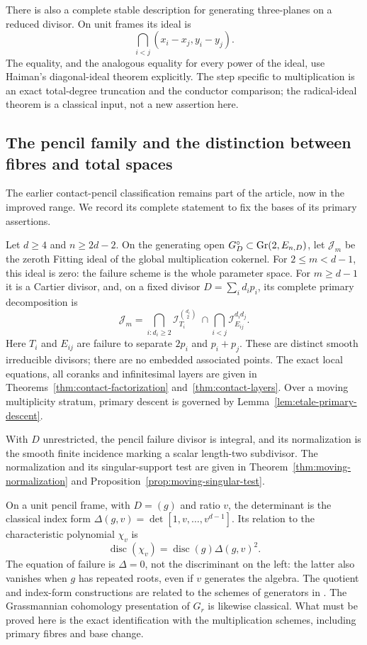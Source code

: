 There is also a complete stable description for generating
three-planes on a reduced divisor. On unit frames its ideal is
\[
 \bigcap_{i<j}(x_i-x_j,y_i-y_j).
\]
The equality, and the analogous equality for every power of the
ideal, use Haiman's diagonal-ideal theorem explicitly. The step
specific to multiplication is an exact total-degree truncation and
the conductor comparison; the radical-ideal theorem is a classical
input, not a new assertion here.

\subsection*{The pencil family and the distinction between fibres and total spaces}
The earlier contact-pencil classification remains part of the article,
now in the improved range. We record its complete statement to fix
the bases of its primary assertions.

\begin{theorem}\label{thm:contact-main}
Let $d\ge4$ and $n\ge2d-2$. On the generating open
$G_D^\circ\subset\operatorname{Gr}(2,E_{n,D})$, let $\mathcal J_m$ be the
zeroth Fitting ideal of the global multiplication cokernel.
For $2\le m<d-1$, this ideal is zero: the failure scheme is the
whole parameter space. For $m\ge d-1$ it is a Cartier divisor,
and, on a fixed divisor $D=\sum_i d_i p_i$, its complete primary
decomposition is
\begin{equation}\label{eq:intro-contact-primary}
 \mathcal J_m=
 \bigcap_{i:d_i\ge2}\mathcal I_{T_i}^{\binom{d_i}{2}}
 \ \cap\!\bigcap_{i<j}\mathcal I_{E_{ij}}^{d_i d_j}.
\end{equation}
Here $T_i$ and $E_{ij}$ are failure to separate $2p_i$ and
$p_i+p_j$. These are distinct smooth irreducible divisors; there
are no embedded associated points. The exact local equations,
all coranks and infinitesimal layers are given in
Theorems~\ref{thm:contact-factorization} and~\ref{thm:contact-layers}.
Over a moving multiplicity stratum, primary descent is governed by
Lemma~\ref{lem:etale-primary-descent}.

With $D$ unrestricted, the pencil failure divisor is integral, and
its normalization is the smooth finite incidence marking a scalar
length-two subdivisor. The normalization and its singular-support
test are given in Theorem~\ref{thm:moving-normalization} and
Proposition~\ref{prop:moving-singular-test}.
\end{theorem}

On a unit pencil frame, with $D=(g)$ and ratio $v$, the determinant
is the classical index form
$\Delta(g,v)=\det[1,v,\ldots,v^{d-1}]$. Its relation to the
characteristic polynomial $\chi_v$ is
\[
 \operatorname{disc}(\chi_v)=\operatorname{disc}(g)\Delta(g,v)^2.
\]
The equation of failure is $\Delta=0$, not the discriminant on the
left: the latter also vanishes when $g$ has repeated roots, even if
$v$ generates the algebra. The quotient and index-form constructions
are related to the schemes of generators in \cite{ABHS}. The
Grassmannian cohomology presentation of $G_r$ is likewise classical.
What must be proved here is the exact identification with the
multiplication schemes, including primary fibres and base change.

